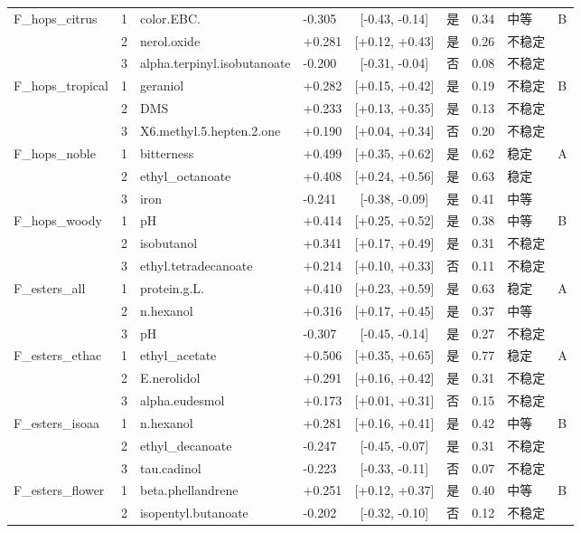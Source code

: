 \begin{longtable}{llllcccll}
F\_hops\_citrus & 1 & color.EBC. & -0.305 & [-0.43, -0.14] & 是 & 0.34 & 中等 & B \\
 & 2 & nerol.oxide & +0.281 & [+0.12, +0.43] & 是 & 0.26 & 不稳定 &  \\
 & 3 & alpha.terpinyl.isobutanoate & -0.200 & [-0.31, -0.04] & 否 & 0.08 & 不稳定 &  \\
F\_hops\_tropical & 1 & geraniol & +0.282 & [+0.15, +0.42] & 是 & 0.19 & 不稳定 & B \\
 & 2 & DMS & +0.233 & [+0.13, +0.35] & 是 & 0.13 & 不稳定 &  \\
 & 3 & X6.methyl.5.hepten.2.one & +0.190 & [+0.04, +0.34] & 否 & 0.20 & 不稳定 &  \\
F\_hops\_noble & 1 & bitterness & +0.499 & [+0.35, +0.62] & 是 & 0.62 & 稳定 & A \\
 & 2 & ethyl\_octanoate & +0.408 & [+0.24, +0.56] & 是 & 0.63 & 稳定 &  \\
 & 3 & iron & -0.241 & [-0.38, -0.09] & 是 & 0.41 & 中等 &  \\
F\_hops\_woody & 1 & pH & +0.414 & [+0.25, +0.52] & 是 & 0.38 & 中等 & B \\
 & 2 & isobutanol & +0.341 & [+0.17, +0.49] & 是 & 0.31 & 不稳定 &  \\
 & 3 & ethyl.tetradecanoate & +0.214 & [+0.10, +0.33] & 否 & 0.11 & 不稳定 &  \\
F\_esters\_all & 1 & protein.g.L. & +0.410 & [+0.23, +0.59] & 是 & 0.63 & 稳定 & A \\
 & 2 & n.hexanol & +0.316 & [+0.17, +0.45] & 是 & 0.37 & 中等 &  \\
 & 3 & pH & -0.307 & [-0.45, -0.14] & 是 & 0.27 & 不稳定 &  \\
F\_esters\_ethac & 1 & ethyl\_acetate & +0.506 & [+0.35, +0.65] & 是 & 0.77 & 稳定 & A \\
 & 2 & E.nerolidol & +0.291 & [+0.16, +0.42] & 是 & 0.31 & 不稳定 &  \\
 & 3 & alpha.eudesmol & +0.173 & [+0.01, +0.31] & 否 & 0.15 & 不稳定 &  \\
F\_esters\_isoaa & 1 & n.hexanol & +0.281 & [+0.16, +0.41] & 是 & 0.42 & 中等 & B \\
 & 2 & ethyl\_decanoate & -0.247 & [-0.45, -0.07] & 是 & 0.31 & 不稳定 &  \\
 & 3 & tau.cadinol & -0.223 & [-0.33, -0.11] & 否 & 0.07 & 不稳定 &  \\
F\_esters\_flower & 1 & beta.phellandrene & +0.251 & [+0.12, +0.37] & 是 & 0.40 & 中等 & B \\
 & 2 & isopentyl.butanoate & -0.202 & [-0.32, -0.10] & 否 & 0.12 & 不稳定 &  \\

\end{longtable}
